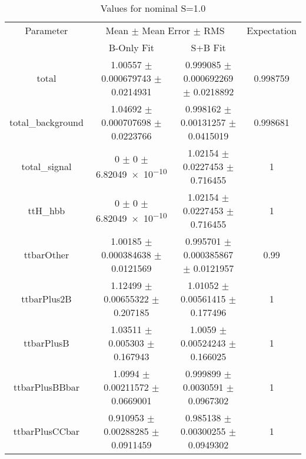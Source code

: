 \begin{table}
\centering
\caption{Values for nominal S=1.0}
\begin{tabular}{cccc}
\toprule
Parameter & \multicolumn{2}{c}{Mean $\pm$ Mean Error $\pm$ RMS} & Expectation\\
 & B-Only Fit & S+B Fit & \\
\midrule
total & \num{1.00557} $\pm$ \num{0.000679743} $\pm$ \num{0.0214931} & \num{0.999085} $\pm$ \num{0.000692269} $\pm$ \num{0.0218892} & \num{0.998759}\\
total\_background & \num{1.04692} $\pm$ \num{0.000707698} $\pm$ \num{0.0223766} & \num{0.998162} $\pm$ \num{0.00131257} $\pm$ \num{0.0415019} & \num{0.998681}\\
total\_signal & \num{0} $\pm$ \num{0} $\pm$ \num{6.82049e-10} & \num{1.02154} $\pm$ \num{0.0227453} $\pm$ \num{0.716455} & \num{1}\\
ttH\_hbb & \num{0} $\pm$ \num{0} $\pm$ \num{6.82049e-10} & \num{1.02154} $\pm$ \num{0.0227453} $\pm$ \num{0.716455} & \num{1}\\
ttbarOther & \num{1.00185} $\pm$ \num{0.000384638} $\pm$ \num{0.0121569} & \num{0.995701} $\pm$ \num{0.000385867} $\pm$ \num{0.0121957} & \num{0.99}\\
ttbarPlus2B & \num{1.12499} $\pm$ \num{0.00655322} $\pm$ \num{0.207185} & \num{1.01052} $\pm$ \num{0.00561415} $\pm$ \num{0.177496} & \num{1}\\
ttbarPlusB & \num{1.03511} $\pm$ \num{0.005303} $\pm$ \num{0.167943} & \num{1.0059} $\pm$ \num{0.00524243} $\pm$ \num{0.166025} & \num{1}\\
ttbarPlusBBbar & \num{1.0994} $\pm$ \num{0.00211572} $\pm$ \num{0.0669001} & \num{0.999899} $\pm$ \num{0.0030591} $\pm$ \num{0.0967302} & \num{1}\\
ttbarPlusCCbar & \num{0.910953} $\pm$ \num{0.00288285} $\pm$ \num{0.0911459} & \num{0.985138} $\pm$ \num{0.00300255} $\pm$ \num{0.0949302} & \num{1}\\
\bottomrule
\end{tabular}
\end{table}
